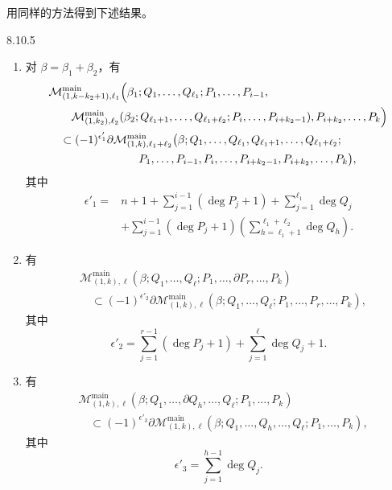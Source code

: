 用同样的方法得到下述结果。

\begin{proposition}{8.10.5}\label{prop:8-10-5}
\begin{enumerate}[label=(\arabic*),leftmargin=2.8em]
\item 对 $\beta=\beta_1+\beta_2$，有
\[
\begin{aligned}
&\mathcal M_{(1,k-k_2+1),\ell_1}^{\mathrm{main}}
\Bigl(\beta_1;Q_1,\ldots,Q_{\ell_1};P_1,\ldots,P_{i-1},\\
&\qquad
\mathcal M_{(1,k_2),\ell_2}^{\mathrm{main}}
(\beta_2;Q_{\ell_1+1},\ldots,Q_{\ell_1+\ell_2};
P_i,\ldots,P_{i+k_2-1}),P_{i+k_2},\ldots,P_k\Bigr)\\
&\quad\subset(-1)^{\epsilon'_1}\partial
\mathcal M_{(1,k),\ell_1+\ell_2}^{\mathrm{main}}
\bigl(\beta;Q_1,\ldots,Q_{\ell_1},Q_{\ell_1+1},\ldots,Q_{\ell_1+\ell_2};\\
&\hspace{8em}
P_1,\ldots,P_{i-1},P_i,\ldots,P_{i+k_2-1},P_{i+k_2},\ldots,P_k\bigr),
\end{aligned}
\]
其中
\[
\begin{aligned}
 \epsilon'_1={}&n+1+
 \sum_{j=1}^{i-1}(\deg P_j+1)
 +\sum_{j=1}^{\ell_1}\deg Q_j\\
 &+\sum_{j=1}^{i-1}(\deg P_j+1)
 \left(\sum_{h=\ell_1+1}^{\ell_1+\ell_2}\deg Q_h\right).
\end{aligned}
\]

\item 有
\[
\begin{aligned}
&\mathcal M_{(1,k),\ell}^{\mathrm{main}}
(\beta;Q_1,\ldots,Q_\ell;P_1,\ldots,\partial P_r,\ldots,P_k)\\
&\quad\subset(-1)^{\epsilon'_2}\partial
\mathcal M_{(1,k),\ell}^{\mathrm{main}}
(\beta;Q_1,\ldots,Q_\ell;P_1,\ldots,P_r,\ldots,P_k),
\end{aligned}
\]
其中
\[
 \epsilon'_2=\sum_{j=1}^{r-1}(\deg P_j+1)
 +\sum_{j=1}^{\ell}\deg Q_j+1.
\]

\item 有
\[
\begin{aligned}
&\mathcal M_{(1,k),\ell}^{\mathrm{main}}
(\beta;Q_1,\ldots,\partial Q_h,\ldots,Q_\ell;P_1,\ldots,P_k)\\
&\quad\subset(-1)^{\epsilon'_3}\partial
\mathcal M_{(1,k),\ell}^{\mathrm{main}}
(\beta;Q_1,\ldots,Q_h,\ldots,Q_\ell;P_1,\ldots,P_k),
\end{aligned}
\]
其中
\[
 \epsilon'_3=\sum_{j=1}^{h-1}\deg Q_j.
\]
\end{enumerate}
\end{proposition}

